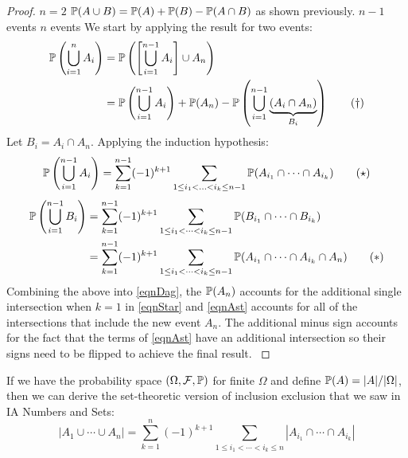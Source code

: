 \documentclass[../main.tex]{subfiles}
\begin{document}
\begin{proof}
  \induction
  {$n = 2$}{
    $\P(A \cup B) = \P(A) + \P(B) - \P(A \cap B)$ as shown previously.
  }
  {$n - 1$ events}{}
  {$n$ events}{
    We start by applying the result for two events:
    \begin{align*}
      \P\left(\bigcup_{i = 1}^{n}  A_i\right) &= \P\left(\left[\bigcup_{i = 1}^{n - 1} A_i\right] \cup A_n\right) \\
                                   &= \P\left(\bigcup_{i = 1}^{n - 1} A_i\right) + \P(A_n) - \P\left(\bigcup_{i = 1}^{n - 1} \underbrace{(A_i \cap A_n)}_{B_i}\right) \tag{$\dag$} \label{eqnDag}
    \end{align*}
    Let $B_i = A_i \cap A_n$.
    Applying the induction hypothesis:
    \[
      \P\left(\bigcup_{i = 1}^{n - 1} A_i\right) = \sum_{k = 1}^{n - 1} (-1)^{k + 1} \sum_{1 \leq i_1 < \ldots < i_k \leq n - 1} \P(A_{i_1} \cap \cdots \cap A_{i_k}) \tag{$\star$} \label{eqnStar}
    \]
    \begin{align*}
      \P\left(\bigcup_{i = 1}^{n - 1} B_i\right) &= \sum_{k = 1}^{n - 1} (-1)^{k + 1} \sum_{1 \leq i_1 < \cdots <i_k \leq n - 1} \P(B_{i_1}\cap \cdots \cap B_{i_k}) \\
                                                 &= \sum_{k = 1}^{n - 1} (-1)^{k + 1} \sum_{1 \leq i_1 < \cdots <i_k \leq n - 1} \P(A_{i_1}\cap \cdots \cap A_{i_k} \cap A_n) \tag{$\ast$} \label{eqnAst}
    \end{align*}
    Combining the above into \cref{eqnDag}, the $\P(A_n)$ accounts for the additional single intersection when $k = 1$ in \cref{eqnStar} and \cref{eqnAst} accounts for all of the intersections that include the new event $A_n$.
    The additional minus sign accounts for the fact that the terms of \cref{eqnAst} have an additional intersection so their signs need to be flipped to achieve the final result.
  }
\end{proof}
If we have the probability space $(\Omega, \salg, \P)$ for finite $\Omega$ and define $\P(A) = |A|/|\Omega|$, then we can derive the set-theoretic version of inclusion exclusion that we saw in IA Numbers and Sets:
\[
  |A_1 \cup \cdots \cup A_n| = \sum_{k = 1}^{n} (-1)^{k + 1} \sum_{1 \leq i_1 < \cdots < i_k \leq n} |A_{i_1} \cap \cdots \cap A_{i_k}|
\]
\end{document}
